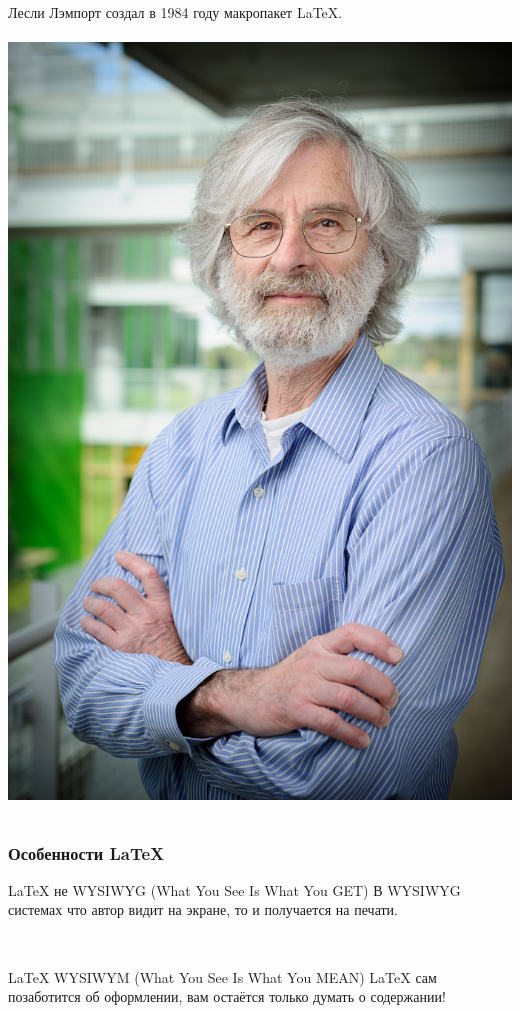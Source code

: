 \documentclass[newPxFont]{beamer}
\begin{document}
\begin{frame}
\begin{columns}
\begin{column}{.48\linewidth}
\centering Лесли Лэмпорт создал в 1984 году макропакет \LaTeX. \\
\mbox{ } \\
\includegraphics[scale=0.4]{LL.jpg}		
\end{column}
\end{columns}
\end{frame}



\begin{frame}
\frametitle{Особенности \LaTeX}
\LaTeX{} не WYSIWYG (What You See Is What You GET)
В WYSIWYG системах что автор видит на экране, то и получается на печати.

\mbox{ } 

\LaTeX{} WYSIWYM (What You See Is What You {\color{green} MEAN})
\LaTeX{} сам позаботится об оформлении, вам остаётся только думать о содержании!
\end{frame}
\end{document}
